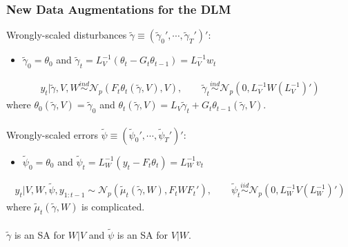 \documentclass[xcolor=dvipsnames]{beamer}
\newcommand\N{\mathcal{N}}
\begin{document}
\begin{frame}
\frametitle{New Data Augmentations for the DLM}
Wrongly-scaled disturbances $\tilde{\gamma}\equiv(\tilde{\gamma}_0',\cdots,\tilde{\gamma}_T')'$:
\begin{itemize}
\item[]$\tilde{\gamma}_0=\theta_0$ and $\tilde{\gamma}_t=L_V^{-1}(\theta_t - G_t\theta_{t-1})=L_V^{-1}w_t$
\end{itemize}
\begin{align*}
  y_t|\tilde{\gamma},V,W \stackrel{ind}{\sim} \N_p\left(F_t\theta_t(\tilde{\gamma},V), V\right), \qquad 
  \tilde{\gamma}_t \stackrel{ind}{\sim} \N_p(0,L_V^{-1}W(L_V^{-1})')
\end{align*}
where $\theta_0(\tilde{\gamma},V)=\tilde{\gamma}_0$ and $\theta_t(\tilde{\gamma},V) = L_V\tilde{\gamma}_t + G_t\theta_{t-1}(\tilde{\gamma},V)$.\\~\\

Wrongly-scaled errors $\tilde{\psi}\equiv(\tilde{\psi}_0',\cdots,\tilde{\psi}_T')'$:
\begin{itemize}
\item[]$\tilde{\psi}_0=\theta_0$ and $\tilde{\psi}_t=L_W^{-1}(y_t - F_t\theta_{t})=L_W^{-1}v_t$
\end{itemize}
\begin{align*}
  y_t|V,W,\tilde{\psi},y_{1:t-1} \sim \N_p(\tilde{\mu}_t(\tilde{\gamma},W), F_tWF_t'), \qquad
  \tilde{\psi}_t  \stackrel{iid}{\sim} \N_p(0,L_W^{-1}V(L_W^{-1})')
\end{align*}
where $\tilde{\mu}_t(\tilde{\gamma},W)$ is complicated.\\~\\

{\color{blue} $\tilde{\gamma}$ is an SA for $W|V$ and $\tilde{\psi}$ is an SA for $V|W$.}
\end{frame}
\end{document}
